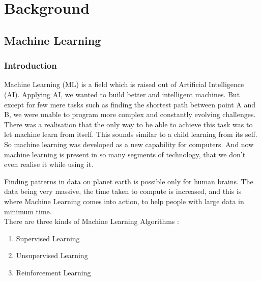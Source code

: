 \documentclass{report}
\begin{document}
\chapter{Background}


\section{Machine Learning}

\subsection{Introduction}
Machine Learning (ML) is a field which is raised out of Artificial Intelligence (AI). Applying AI, we wanted to build better and intelligent
machines. But except for few mere tasks such as finding the shortest path between point A and B, we were unable to program more complex
and constantly evolving challenges. There was a realisation that the only way to be able to achieve this task was to let machine learn
from itself. This sounds similar to a child learning from its self. So machine learning was developed as a new capability for computers.
And now machine learning is present in so many segments of technology, that we don’t even realise it while using it. \par
Finding patterns in data on planet earth is possible only for human brains. The data being very massive, the time taken to compute is
increased, and this is where Machine Learning comes into action, to help people with large data in minimum time. \\
There are three kinds of Machine Learning Algorithms :
 
\begin{enumerate}
\item Supervised Learning
\item Unsupervised Learning
\item Reinforcement Learning
\end{enumerate}
\end{document}
